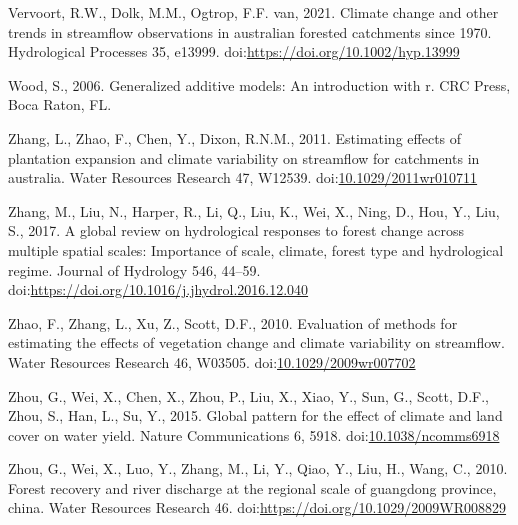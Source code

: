 \documentclass[]{elsarticle} %
\newlength{\cslhangindent}
\newlength{\cslentryspacingunit} %
\newenvironment{CSLReferences}[2] %
 {%
  \setlength{\parindent}{0pt}
  \ifodd #1
  \let\oldpar\par
  \def\par{\hangindent=\cslhangindent\oldpar}
  \fi
  \setlength{\parskip}{#2\cslentryspacingunit}
 }%
 {}
\begin{document}
\begin{CSLReferences}{1}{0}
\leavevmode{}%
Vervoort, R.W., Dolk, M.M., Ogtrop, F.F. van, 2021. Climate change and other trends in streamflow observations in australian forested catchments since 1970. Hydrological Processes 35, e13999. doi:\url{https://doi.org/10.1002/hyp.13999}

\leavevmode{}%
Wood, S., 2006. Generalized additive models: An introduction with r. CRC Press, Boca Raton, FL.

\leavevmode{}%
Zhang, L., Zhao, F., Chen, Y., Dixon, R.N.M., 2011. Estimating effects of plantation expansion and climate variability on streamflow for catchments in australia. Water Resources Research 47, W12539. doi:\href{https://doi.org/10.1029/2011wr010711}{10.1029/2011wr010711}

\leavevmode{}%
Zhang, M., Liu, N., Harper, R., Li, Q., Liu, K., Wei, X., Ning, D., Hou, Y., Liu, S., 2017. A global review on hydrological responses to forest change across multiple spatial scales: Importance of scale, climate, forest type and hydrological regime. Journal of Hydrology 546, 44--59. doi:\url{https://doi.org/10.1016/j.jhydrol.2016.12.040}

\leavevmode{}%
Zhao, F., Zhang, L., Xu, Z., Scott, D.F., 2010. Evaluation of methods for estimating the effects of vegetation change and climate variability on streamflow. Water Resources Research 46, W03505. doi:\href{https://doi.org/10.1029/2009wr007702}{10.1029/2009wr007702}

\leavevmode{}%
Zhou, G., Wei, X., Chen, X., Zhou, P., Liu, X., Xiao, Y., Sun, G., Scott, D.F., Zhou, S., Han, L., Su, Y., 2015. Global pattern for the effect of climate and land cover on water yield. Nature Communications 6, 5918. doi:\href{https://doi.org/10.1038/ncomms6918}{10.1038/ncomms6918}

\leavevmode{}%
Zhou, G., Wei, X., Luo, Y., Zhang, M., Li, Y., Qiao, Y., Liu, H., Wang, C., 2010. Forest recovery and river discharge at the regional scale of guangdong province, china. Water Resources Research 46. doi:\url{https://doi.org/10.1029/2009WR008829}

\end{CSLReferences}
\end{document}
